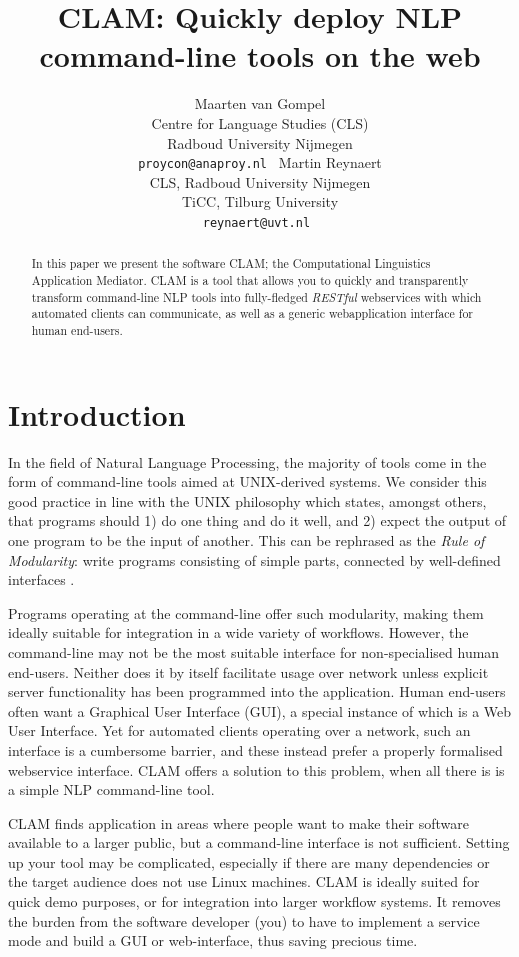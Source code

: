 \documentclass[11pt]{article}
\title{CLAM: Quickly deploy NLP command-line tools on the web}
\author{Maarten van Gompel \\ 
  Centre for Language Studies (CLS) \\
  Radboud University Nijmegen \\
  {\tt proycon@anaproy.nl } \And 
  Martin Reynaert \\
  CLS, Radboud University Nijmegen \\
  TiCC, Tilburg University  \\
  {\tt reynaert@uvt.nl } 
  }
\date{}
\begin{document}
\maketitle

\begin{abstract}
In this paper we present the software CLAM; the Computational Linguistics
Application Mediator. CLAM is a tool that allows you to quickly and
transparently transform command-line NLP tools into fully-fledged
\emph{RESTful}\/ webservices with which automated clients can communicate, as
well as a generic webapplication interface for human end-users.
\end{abstract}


\section{Introduction}

In the field of Natural Language Processing, the majority of tools come in the
form of command-line tools aimed at UNIX-derived systems. We consider this good
practice in line with the UNIX philosophy \cite{unixphilo} which states,
amongst others, that programs should 1) do one thing and do it well, and 2) expect the output of one
program to be the input of another. This can be rephrased as the \emph{Rule of
Modularity}: write programs consisting of simple parts, connected by
well-defined interfaces \cite{RAYMOND2004}.

Programs operating at the command-line
offer such modularity, making them ideally suitable for integration in a
wide variety of workflows. However, the command-line may not be the most suitable interface for non-specialised
human end-users. Neither does it by itself facilitate usage over network unless
explicit server functionality has been programmed into the application.
Human end-users often want a Graphical User Interface (GUI), a special instance of which
is a Web User Interface. Yet for automated clients operating over a network, such an interface is a
cumbersome barrier, and these instead prefer a properly formalised webservice
interface. CLAM offers a solution to this problem, when all there is is a
simple NLP command-line tool.

CLAM finds application in areas where people want to make their software
available to a larger public, but a command-line interface is not sufficient.
Setting up your tool may be complicated, especially if there are many
dependencies or the target audience does not use Linux machines. CLAM is
ideally suited for quick demo purposes, or for integration into larger workflow
systems. It removes the burden from the software developer (you) to have to
implement a service mode and build a GUI or web-interface, thus saving precious
time.
\end{document}
